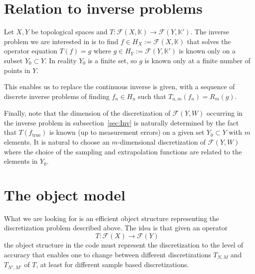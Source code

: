 \documentclass[a4paper]{article}
\newcommand{\cF}{\mathcal{F}}
\newcommand{\K}{\mathbb{K}}
\newcommand{\true}{\text{true}}
\begin{document}
\section{Relation to inverse problems}
Let $X, Y$ be topological spaces and $T \colon \cF(X,\K) \to 
\cF(Y,\K')$. The inverse problem we are interested in is to find 
$f\in H_{X}:=\cF(X,\K)$ that solves the operator equation $T(f)=g$ where 
$g\in H_{Y}:=\cF(Y,\K')$ is 
known only on a subset $Y_{0}\subset Y$. In reality $Y_{0}$ is a 
finite set, so $g$ is known only at a finite number of points in $Y$. 

This enables us to replace the continuous inverse  is given, with a sequence of 
discrete inverse problems of finding $f_{n}\in H_{n}$ such that 
$T_{n,m}(f_{n})=R_{m}(g)$.

Finally, note that the dimension of the discretization of  $\cF(Y,W)$ 
occurring in the inverse problem in subsection~\ref{sec:Inv} is naturally 
determined by the fact that $T(f_{\true})$ is known (up to measurement 
errors) on a given set $Y_{0}\subset Y$ with $m$ elements. 
It is natural to choose an $m$-dimensional discretization of 
$\cF(Y,W)$ where the choice of the sampling and extrapolation functions are 
related to the elements in $Y_{0}$.



   
\section{The object model}
What we are looking for is an efficient object structure representing 
the discretization problem described above. The idea is that given an 
operator 
\[ T \colon \cF(X) \to \cF(Y) \]
the object structure in the code must represent the discretization to 
the level of accuracy that enables one to change between different
discretizations $T_{N,M}$ and $T_{N',M'}$ of $T$, at least 
for different sample based discretizations.
\end{document}
